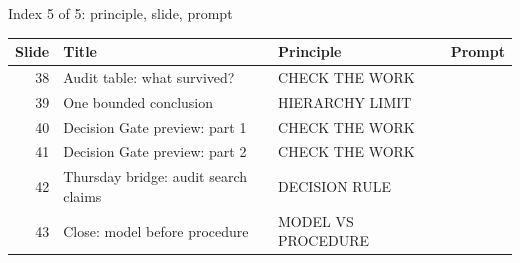 \begin{frame}{Index 5 of 5: principle, slide, prompt}
\scriptsize
\begin{tabular}{@{}r>{\raggedright\arraybackslash}p{5.1cm}>{\raggedright\arraybackslash}p{4.7cm}p{1.2cm}@{}}
\textbf{Slide} & \textbf{Title} & \textbf{Principle} & \textbf{Prompt}\\\midrule
38 & Audit table: what survived? & CHECK THE WORK & \\
39 & One bounded conclusion & HIERARCHY LIMIT & \\
40 & Decision Gate preview: part 1 & CHECK THE WORK & \\
41 & Decision Gate preview: part 2 & CHECK THE WORK & \\
42 & Thursday bridge: audit search claims & DECISION RULE & \\
43 & Close: model before procedure & MODEL VS PROCEDURE & \\
\end{tabular}
\end{frame}
